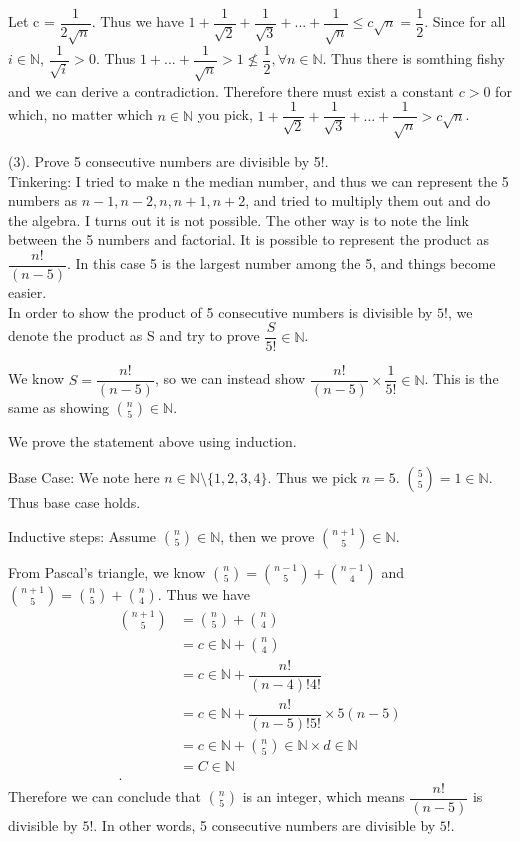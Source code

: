 \documentclass{article}
\begin{document}
	Let c = $\dfrac{1}{2\sqrt{n}}$. Thus we have $1+\dfrac{1}{\sqrt{2}}+\dfrac{1}{\sqrt{3}}+...+\dfrac{1}{\sqrt{n}} \leq c\sqrt{n} = \dfrac{1}{2}$. Since for all $i \in \mathbb{N}$, $\dfrac{1}{\sqrt{i}}>0$. Thus $1+...+\dfrac{1}{\sqrt{n}} > 1 \nleq \dfrac{1}{2}, \forall n \in  \mathbb{N}$. Thus there is somthing fishy and we can derive a contradiction. Therefore there must exist a constant $c>0$ for which, no matter which $n \in \mathbb{N}$ you pick, $1+\dfrac{1}{\sqrt{2}} + \dfrac{1}{\sqrt{3}}+...+\dfrac{1}{\sqrt{n}}>c\sqrt{n}$.\\ 
	
	\newpage
	
	\noindent (3).
	Prove 5 consecutive numbers are divisible by 5!.\\
	Tinkering: I tried to make n the median number, and thus we can represent the 5 numbers as $n-1,n-2,n,n+1,n+2$, and tried to multiply them out and do the algebra. I turns out it is not possible. The other way is to note the link between the 5 numbers and factorial. It is possible to represent the product as $\dfrac{n!}{(n-5)}$. In this case 5 is the largest number among the 5, and things become easier.\\
	
	\text{\bf \textcolor{red}{Prove:}} In order to show the product of 5 consecutive numbers is divisible by $5!$, we denote the product as S and try to prove $\dfrac{S}{5!} \in \mathbb{N}$. 
	
	We know $S = \dfrac{n!}{(n-5)}$, so we can instead show $\dfrac{n!}{(n-5)} \times \dfrac{1}{5!} \in \mathbb{N}$. This is the same as showing $\binom{n}{5} \in \mathbb{N}$.
	
	We prove the statement above using induction.
	
	Base Case: We note here $n \in \mathbb{N} \setminus \{1,2,3,4\}$. Thus we pick $n=5$. $\binom{5}{5} = 1 \in \mathbb{N}$. Thus base case holds. 
	
	Inductive steps: Assume $\binom{n}{5} \in \mathbb{N}$, then we prove $\binom{n+1}{5} \in \mathbb{N}$.
	
	From Pascal's triangle, we know $\binom{n}{5} = \binom{n-1}{5}+\binom{n-1}{4}$ and $\binom{n+1}{5} = \binom{n}{5} + \binom{n}{4}$. Thus we have 
	\begin{align*}
		\binom{n+1}{5} &= \binom{n}{5} + \binom{n}{4}\\
					   &= c \in \mathbb{N} + \binom{n}{4}\\
					   &= c \in \mathbb{N} + \dfrac{n!}{(n-4)!4!}\\
					   &= c \in \mathbb{N} + \dfrac{n!}{(n-5)!5!} \times 5(n-5)\\
					   &= c \in \mathbb{N} + \binom{n}{5} \in \mathbb{N} \times d \in \mathbb{N}\\
					   &= C \in \mathbb{N}\\.
	\end{align*}
	Therefore we can conclude that $\binom{n}{5}$ is an integer, which means $\dfrac{n!}{(n-5)}$ is divisible by $5!$. In other words, 5 consecutive numbers are divisible by $5!$.
	\newpage
	
\end{document}
